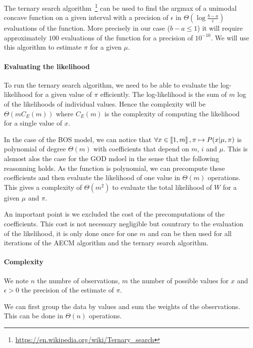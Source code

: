 The ternary search algorithm~\footnote{\url{https://en.wikipedia.org/wiki/Ternary_search}} can be used to find the argmax of a unimodal  concave function on a given interval with a precision of $\epsilon$ in $\Theta(\log \frac{b - a}{\epsilon})$ evaluations of the function. More precisely in our case ($b - a \leq 1$) it will require approximately $100$ evaluations of the function for a precision of $10^{-10}$.
We will use this algorithm to estimate $\pi$ for a given $\mu$.



\paragraph{Evaluating the likelihood}

To run the ternary search algorithm, we need to be able to evaluate the log-likelihood for a given value of $\pi$ efficiently.
The log-likelihood is the sum of $m$ log of the likelihoods of individual values.
Hence the complexity will be $\Theta(m C_E(m))$ where $C_E(m)$ is the complexity of computing the likelihood for a single value of $x$.

In the case of the BOS model, we can notice that $\forall x \in \left\llbracket1, m\right\rrbracket, \pi \mapsto P(x | \mu, \pi)$ is polynomial of degree $\Theta(m)$ with coefficients that depend on $m$, $i$ and $\mu$. This is alsmost alos the case for the GOD mdoel in the sense that the following reasonning holds. As the function is polynomial, we can precompute these coefficients and then evaluate the likelihood of one value in $\Theta(m)$ operations. This gives a complexity of $\Theta(m^2)$ to evaluate the total likelihood of $W$ for a given $\mu$ and $\pi$. 

An important point is we excluded the cost of the precomputations of the coefficients. This cost is not necessary negligible but countrary to the evaluation of the likelihood, it is only done once for one $m$ and can be then used for all iterations of the AECM algorithm and the ternary search algorithm.


\paragraph{Complexity}

We note $n$ the numbre of observations, $m$ the number of possible values for $x$ and $\epsilon > 0$ the precision of the estimate of $\pi$.

We can first group the data by values and sum the weights of the observations. This can be done in $\Theta(n)$ operations.

